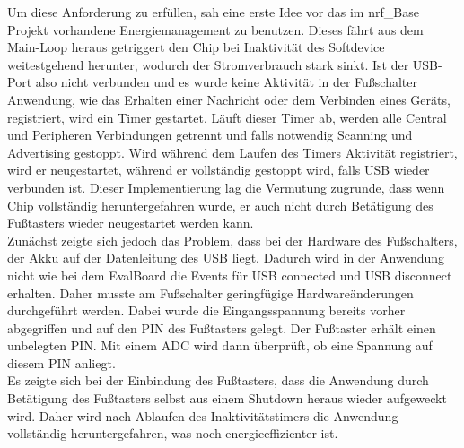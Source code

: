 Um diese Anforderung zu erfüllen, sah eine erste Idee vor das im nrf\_Base Projekt vorhandene Energiemanagement zu benutzen. Dieses fährt aus dem Main-Loop heraus getriggert den Chip bei Inaktivität des Softdevice weitestgehend herunter, wodurch der Stromverbrauch stark sinkt. Ist der \ac{USB}-Port also nicht verbunden und es wurde keine Aktivität in der Fußschalter Anwendung, wie das Erhalten einer Nachricht oder dem Verbinden eines Geräts, registriert, wird ein Timer gestartet. Läuft dieser Timer ab, werden alle Central und Peripheren Verbindungen getrennt und falls notwendig Scanning und Advertising gestoppt. Wird während dem Laufen des Timers Aktivität registriert, wird er neugestartet, während er vollständig gestoppt wird, falls \ac{USB} wieder verbunden ist. Dieser Implementierung lag die Vermutung zugrunde, dass wenn Chip vollständig heruntergefahren wurde, er auch nicht durch Betätigung des Fußtasters wieder neugestartet werden kann.\\
Zunächst zeigte sich jedoch das Problem, dass bei der Hardware des Fußschalters, der Akku auf der Datenleitung des \ac{USB} liegt. Dadurch wird in der Anwendung nicht wie bei dem EvalBoard die Events für \ac{USB} connected und \ac{USB} disconnect erhalten. Daher musste am Fußschalter geringfügige Hardwareänderungen durchgeführt werden. Dabei wurde die Eingangsspannung bereits vorher abgegriffen und auf den PIN des Fußtasters gelegt. Der Fußtaster erhält einen unbelegten PIN. Mit einem ADC wird dann überprüft, ob eine Spannung auf diesem PIN anliegt.\\
Es zeigte sich bei der Einbindung des Fußtasters, dass die Anwendung durch Betätigung des Fußtasters selbst aus einem Shutdown heraus wieder aufgeweckt wird. Daher wird nach Ablaufen des Inaktivitätstimers die Anwendung vollständig heruntergefahren, was noch energieeffizienter ist.

